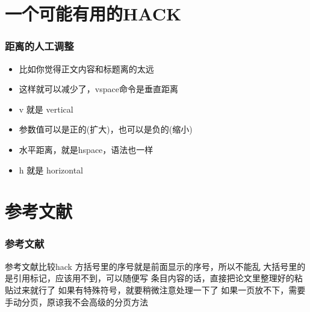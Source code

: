     \section{一个可能有用的HACK}
    
    \begin{frame}
        \frametitle{距离的人工调整}
        \vspace{-6cm} %
        \begin{itemize}
            \item 比如你觉得正文内容和标题离的太远
            \item 这样就可以减少了，vspace命令是垂直距离
            \item v 就是 vertical
            \item 参数值可以是正的(扩大)，也可以是负的(缩小)
            \item 水平距离，就是hspace，语法也一样
            \item h 就是 horizontal
        \end{itemize}
    \end{frame}
    
    \section{参考文献}
    
    \begin{frame}
        \frametitle{参考文献}
        \vspace{-1.5cm}
        \begin{thebibliography}{}
             参考文献比较hack
             方括号里的序号就是前面显示的序号，所以不能乱
             大括号里的是引用标记，应该用不到，可以随便写
             条目内容的话，直接把论文里整理好的粘贴过来就行了
             如果有特殊符号，就要稍微注意处理一下了
             如果一页放不下，需要手动分页，原谅我不会高级的分页方法
        \end{thebibliography}
    \end{frame}

    


